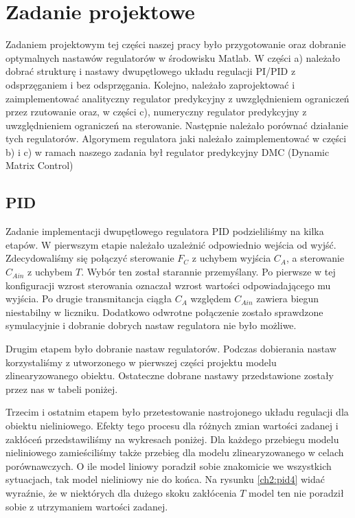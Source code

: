 \chapter{Zadanie projektowe}

Zadaniem projektowym tej części naszej pracy było przygotowanie oraz dobranie optymalnych nastawów regulatorów w środowisku Matlab. W części a) należało dobrać strukturę i nastawy dwupętlowego układu regulacji PI/PID z odsprzęganiem i bez odsprzęgania. Kolejno, należało zaprojektować i zaimplementować analityczny regulator predykcyjny z uwzględnieniem ograniczeń przez rzutowanie oraz, w części c), numeryczny regulator predykcyjny z uwzględnieniem ograniczeń na sterowanie. Następnie należało porównać działanie tych regulatorów. Algorymem regulatora jaki należało zaimplementować w części b) i c) w ramach naszego zadania był regulator predykcyjny DMC (Dynamic Matrix Control)

\section{PID}
Zadanie implementacji dwupętlowego regulatora PID podzieliliśmy na kilka etapów. W pierwszym etapie należało uzależnić odpowiednio wejścia od wyjść. Zdecydowaliśmy się połączyć sterowanie $F_C$ z uchybem wyjścia $C_A$, a sterowanie $C_{Ain}$ z uchybem $T$. Wybór ten został starannie przemyślany. Po pierwsze w tej konfiguracji wzrost sterowania oznaczał wzrost wartości odpowiadającego mu wyjścia. Po drugie transmitancja ciągła $C_A$ względem $C_{Ain}$ zawiera biegun niestabilny w liczniku. Dodatkowo odwrotne połączenie zostało sprawdzone symulacyjnie i dobranie dobrych nastaw regulatora nie było możliwe.

Drugim etapem było dobranie nastaw regulatorów. Podczas dobierania nastaw korzystaliśmy z utworzonego w pierwszej części projektu modelu zlinearyzowanego obiektu. Ostateczne dobrane nastawy przedstawione zostały przez nas w tabeli poniżej.

Trzecim i ostatnim etapem było przetestowanie nastrojonego układu regulacji dla obiektu nieliniowego. Efekty tego procesu dla różnych zmian wartości zadanej i zakłóceń przedstawiliśmy na wykresach poniżej. Dla każdego przebiegu modelu nieliniowego zamieściliśmy także przebieg dla modelu zlinearyzowanego w celach porównawczych. O ile model liniowy poradził sobie znakomicie we wszystkich sytuacjach, tak model nieliniowy nie do końca. Na rysunku \ref{ch2:pid4} widać wyraźnie, że w niektórych dla dużego skoku zakłócenia $T$ model ten nie poradził sobie z utrzymaniem wartości zadanej.

